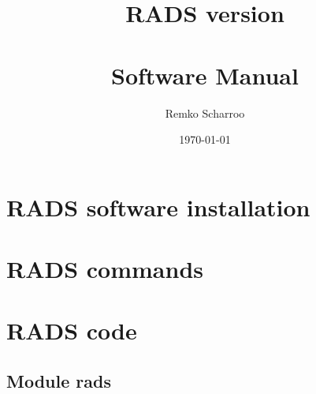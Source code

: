 \documentclass[a4paper,10pt,openany,natbib,nomargin]{thesis}
\title{RADS version \vernum \\ ~ \\
Software Manual}
\author{Remko Scharroo}
\date{\today}
\begin{document}
\makeatletter
\renewcommand{\tiny}{\@setfontsize\tiny{5.8pt}{6.5}}
\makeatother

\maketitle
\tableofcontents

\chapter{RADS software installation}
\chapter{RADS commands}
\chapter{RADS code}
\section{Module rads}

%
\printindex
\end{document}
